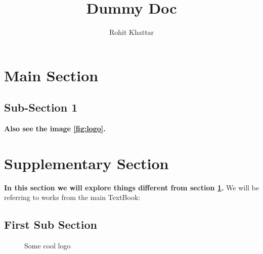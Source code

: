 \documentclass[a4paper,11pt]{article}
\author{Rohit Khattar}
\title{Dummy Doc}
\begin{document}
\maketitle
\tableofcontents
\section{Main Section} \label{section1}

\lipsum[2-4]
 
\subsection{Sub-Section 1}
\textbf{Also see the image \ref{fig:logo}.}\newline
\lipsum[15]

\section{Supplementary Section}
\textbf{In this section we will explore things different from section \ref{section1}.}\newline
We will be referring to works from the main TextBook: \cites[page 3]{Labov1972}\newline
\lipsum[1]
 
\subsection{First Sub Section}

\lipsum[2-4]

\begin{figure}[!htb]
\label{fig:logo}
\caption{\label{fig:my-label} Some cool logo}
\end{figure}
\end{document}
